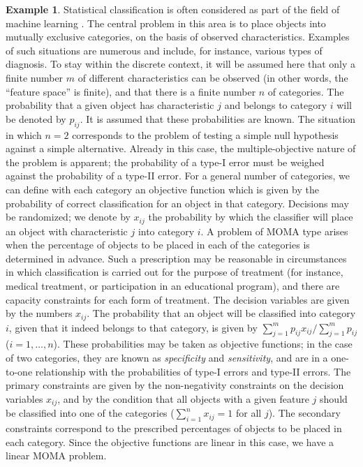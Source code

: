 \documentclass{article}
\theoremstyle{definition}
\newtheorem{example}[theorem]{Example}
\begin{document}
\begin{example} \label{classification}
Statistical classification is often considered as part of the field of machine learning \cite{Michie}. The central problem in this area
is to place objects into mutually exclusive categories, on the basis of observed characteristics. Examples of such situations are numerous and include, for instance, various types of diagnosis. To stay within the discrete context, it will be assumed here that only a finite number $m$ of different characteristics can be observed (in other words, the ``feature space'' is finite), and that there is a finite number $n$ of categories. The probability that a given object has characteristic $j$ and belongs to category $i$ will be denoted by $p_{ij}$. It is assumed that these probabilities are known. The situation in which $n=2$ corresponds to the problem of testing a simple null hypothesis against a simple alternative. Already in this case, the multiple-objective nature of the problem is apparent; the probability of a type-I error must be weighed against the probability of a type-II error. For a general number of categories, we can define with each category an objective function which is given by the probability of correct classification for an object in that category. Decisions may be randomized; we denote by $x_{ij}$ the probability by which the classifier will place an object with characteristic $j$ into category $i$. A problem of MOMA type arises when the percentage of objects to be placed in each of the categories is determined in advance. Such a prescription may be reasonable in circumstances in which classification is carried out for the purpose of treatment (for instance, medical treatment, or participation in an educational program), and there are capacity constraints for each form of treatment. The decision variables are given by the numbers $x_{ij}$. The probability that an object will be classified into category $i$, given that it indeed belongs to that category, is given by $\sum_{j=1}^m p_{ij}x_{ij}/\sum_{j=1}^m p_{ij}$ ($i=1,\dots,n$). These probabilities may be taken as objective functions; in the case of two categories, they are known as \emph{specificity} and \emph{sensitivity}, and are in a one-to-one relationship with the probabilities of type-I errors and type-II errors. The primary constraints are given by the non-negativity constraints on the decision variables $x_{ij}$, and by the condition that all objects with a given feature $j$ should be classified into one of the categories ($\sum_{i=1}^n x_{ij} = 1$ for all $j$). The secondary constraints correspond to the prescribed percentages of objects to be placed in each category. Since the objective functions are linear in this case, we have a linear MOMA problem.
\end{example}
\end{document}
